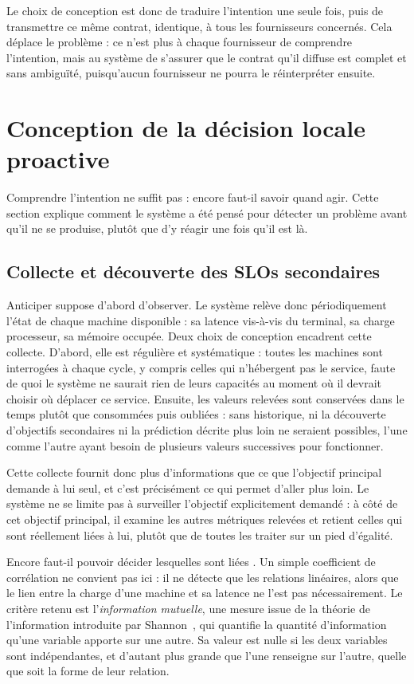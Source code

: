 Le choix de conception est donc de traduire l'intention une seule fois, puis de transmettre ce même contrat, identique, à tous les fournisseurs concernés. Cela déplace le problème : ce n'est plus à chaque fournisseur de comprendre l'intention, mais au système de s'assurer que le contrat qu'il diffuse est complet et sans ambiguïté, puisqu'aucun fournisseur ne pourra le réinterpréter ensuite.
\section{Conception de la décision locale proactive}
\label{sec:conception-decision-locale}

Comprendre l'intention ne suffit pas : encore faut-il savoir quand agir. Cette section explique comment le système a été pensé pour détecter un problème avant qu'il ne se produise, plutôt que d'y réagir une fois qu'il est là.

\subsection{Collecte et découverte des SLOs secondaires}

Anticiper suppose d'abord d'observer. Le système relève donc périodiquement l'état de chaque machine disponible : sa latence vis-à-vis du terminal, sa charge processeur, sa mémoire occupée. Deux choix de conception encadrent cette collecte. D'abord, elle est régulière et systématique : toutes les machines sont interrogées à chaque cycle, y compris celles qui n'hébergent pas le service, faute de quoi le système ne saurait rien de leurs capacités au moment où il devrait choisir où déplacer ce service. Ensuite, les valeurs relevées sont conservées dans le temps plutôt que consommées puis oubliées : sans historique, ni la découverte d'objectifs secondaires ni la prédiction décrite plus loin ne seraient possibles, l'une comme l'autre ayant besoin de plusieurs valeurs successives pour fonctionner.

Cette collecte fournit donc plus d'informations que ce que l'objectif principal demande à lui seul, et c'est précisément ce qui permet d'aller plus loin. Le système ne se limite pas à surveiller l'objectif explicitement demandé : à côté de cet objectif principal, il examine les autres métriques relevées et retient celles qui sont réellement liées à lui, plutôt que de toutes les traiter sur un pied d'égalité.

Encore faut-il pouvoir décider lesquelles sont \og liées \fg. Un simple coefficient de corrélation ne convient pas ici : il ne détecte que les relations linéaires, alors que le lien entre la charge d'une machine et sa latence ne l'est pas nécessairement. Le critère retenu est l'\emph{information mutuelle}, une mesure issue de la théorie de l'information introduite par Shannon~\cite{shannon1948}, qui quantifie la quantité d'information qu'une variable apporte sur une autre. Sa valeur est nulle si les deux variables sont indépendantes, et d'autant plus grande que l'une renseigne sur l'autre, quelle que soit la forme de leur relation.

